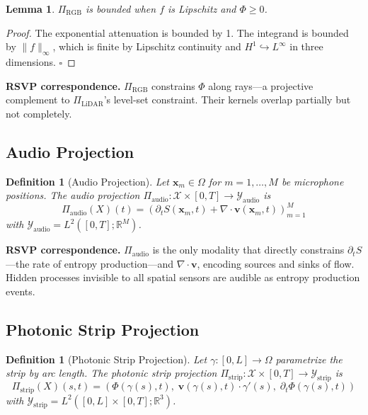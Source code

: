 \documentclass[12pt, oneside]{article}
\newtheorem{lemma}[theorem]{Lemma}
\newtheorem{definition}[theorem]{Definition}
\begin{document}
\begin{lemma}
$\Pi_{\mathrm{RGB}}$ is bounded when $f$ is Lipschitz and $\Phi \ge 0$.
\end{lemma}
\begin{proof}
The exponential attenuation is bounded by 1. The integrand is bounded by $\|f\|_\infty$,
which is finite by Lipschitz continuity and $H^1 \hookrightarrow L^\infty$ in three
dimensions. $\square$
\end{proof}

\textbf{RSVP correspondence.} $\Pi_{\mathrm{RGB}}$ constrains $\Phi$ along rays---a
projective complement to $\Pi_{\mathrm{LiDAR}}$'s level-set constraint. Their kernels
overlap partially but not completely.

\subsection{Audio Projection}

\begin{definition}[Audio Projection]
Let $\mathbf{x}_m \in \Omega$ for $m = 1,\ldots,M$ be microphone positions. The audio
projection $\Pi_{\mathrm{audio}} : \mathcal{X} \times [0,T] \to \mathcal{Y}_{\mathrm{audio}}$
is
\[
\Pi_{\mathrm{audio}}(X)(t) =
\left( \partial_t S(\mathbf{x}_m, t) + \nabla \cdot \mathbf{v}(\mathbf{x}_m, t)
\right)_{m=1}^M
\]
with $\mathcal{Y}_{\mathrm{audio}} = L^2([0,T];\mathbb{R}^M)$.
\end{definition}

\textbf{RSVP correspondence.} $\Pi_{\mathrm{audio}}$ is the only modality that directly
constrains $\partial_t S$---the rate of entropy production---and $\nabla \cdot \mathbf{v}$,
encoding sources and sinks of flow. Hidden processes invisible to all spatial sensors are
audible as entropy production events.

\subsection{Photonic Strip Projection}

\begin{definition}[Photonic Strip Projection]
Let $\gamma : [0,L] \to \Omega$ parametrize the strip by arc length. The photonic strip
projection $\Pi_{\mathrm{strip}} : \mathcal{X} \times [0,T] \to \mathcal{Y}_{\mathrm{strip}}$
is
\[
\Pi_{\mathrm{strip}}(X)(s,t) =
\left( \Phi(\gamma(s),t),\;
\mathbf{v}(\gamma(s),t) \cdot \gamma'(s),\;
\partial_t \Phi(\gamma(s),t) \right)
\]
with $\mathcal{Y}_{\mathrm{strip}} = L^2([0,L] \times [0,T];\mathbb{R}^3)$.
\end{definition}
\end{document}

